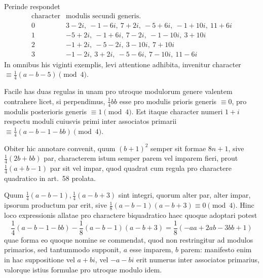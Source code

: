 Perinde respondet
\[
\begin{array}{c|l}
\text{character}&\text{modulis secundi generis.}\\\hline
0&3-2i,\ -1-6i,\ 7+2i,\ -5+6i,\ -1+10i,\ 11+6i\\
1&-5+2i,\ -1+6i,\ 7-2i,\ -1-10i,\ 3+10i\\
2&-1+2i,\ -5-2i,\ 3-10i,\ 7+10i\\
3&-1-2i,\ 3+2i,\ -5-6i,\ 7-10i,\ 11-6i
\end{array}
\]
In omnibus his viginti exemplis, levi attentione adhibita, invenitur character $\equiv\frac14(a-b-5)\pmod4$.

Facile has duas regulas in unam pro utroque modulorum genere valentem contrahere licet, si perpendimus, $\frac14bb$ esse pro modulis prioris generis $\equiv0$, pro modulis posterioris generis $\equiv1\pmod4$. Est itaque character numeri $1+i$ respectu moduli cuiusvis primi inter associatos primarii $\equiv\frac14(a-b-1-bb)\pmod4$.

Obiter hic annotare convenit, quum $(b+1)^2$ semper sit formae $8n+1$, sive $\frac14(2b+bb)$ par, characterem istum semper parem vel imparem fieri, prout $\frac14(a+b-1)$ par sit vel impar, quod quadrat cum regula pro charactere quadratico in art.~58 prolata.

Quum $\frac14(a-b-1),\frac14(a-b+3)$ sint integri, quorum alter par, alter impar, ipsorum productum par erit, sive $\frac18(a-b-1)(a-b+3)\equiv0\pmod4$. Hinc loco expressionis allatae pro charactere biquadratico haec quoque adoptari potest
\[
\frac14(a-b-1-bb)-\frac18(a-b-1)(a-b+3)=\frac18(-aa+2ab-3bb+1)
\]
quae forma eo quoque nomine se commendat, quod non restringitur ad modulos primarios, sed tantummodo supponit, $a$ esse imparem, $b$ parem: manifesto enim in hac suppositione vel $a+bi$, vel $-a-bi$ erit numerus inter associatos primarius, valorque istius formulae pro utroque modulo idem.

